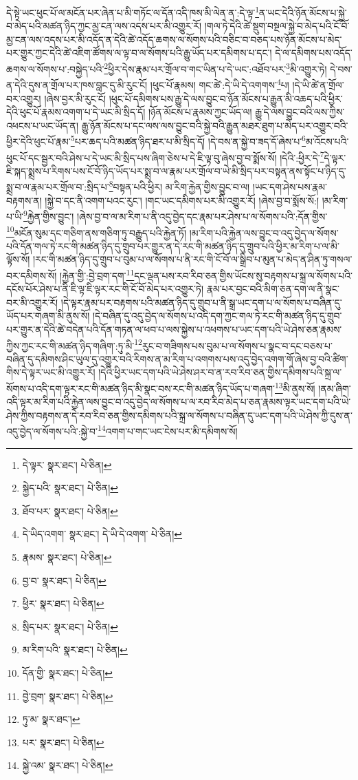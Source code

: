 དེ་སྟེ་ཡང་ཕུང་པོ་ལ་མངོན་པར་ཞེན་པ་མི་གཏོང་ལ་དོན་འདི་ཁས་མི་ལེན་ན་:དེ་ལྟ་\footnote{དེ་ལྟར་  སྣར་ཐང་།  པེ་ཅིན། }ན་ཡང་དེའི་ཉོན་མོངས་པ་སྐྱེ་བ་མེད་པའི་མཚན་ཉིད་ཀྱང་མྱ་ངན་ལས་འདས་པར་མི་འགྱུར་རོ། །གལ་ཏེ་དེའི་ཚེ་སྡུག་བསྔལ་སྐྱེ་བ་མེད་པའི་ངོ་བོ་མྱ་ངན་ལས་འདས་པར་མི་འདོད་ན་དེའི་ཚེ་འདོད་ཆགས་ལ་སོགས་པའི་བཅིང་བ་བཅད་པས་ཉོན་མོངས་པ་མེད་པར་གྱུར་ཀྱང་དེའི་ཚེ་འཇིག་ཚོགས་ལ་ལྟ་བ་ལ་སོགས་པའི་རྒྱུ་ཡོད་པར་དམིགས་པ་དང་། དེ་ལ་དམིགས་པས་འདོད་ཆགས་ལ་སོགས་པ་:བསྐྱེད་པའི་\footnote{སྐྱེད་པའི་  སྣར་ཐང་།  པེ་ཅིན། }ཕྱིར་དེས་རྣམ་པར་གྲོལ་བ་གང་ཡིན་པ་དེ་ཡང་:འཐོབ་པར་\footnote{ཐོབ་པར་  སྣར་ཐང་།  པེ་ཅིན། }མི་འགྱུར་ཏེ། དེ་བས་ན་དེའི་དུས་ན་གྲོལ་པར་ཁས་བླང་དུ་མི་རུང་ངོ། །ཕུང་པོ་རྣམས། གང་ཚེ་:དེ་ཡི་དེ་འགགས་\footnote{དེ་ཡིད་འགག་  སྣར་ཐང་། དེ་ཡི་དེ་འགག་  པེ་ཅིན། }པ། །དེ་ཡི་ཚེ་ན་གྲོལ་བར་འགྱུར། །ཞེས་བྱར་མི་རུང་ངོ། །ཕུང་པོ་དམིགས་པས་རྒྱུ་དེ་ལས་བྱུང་བ་ཉོན་མོངས་པ་རྒྱུན་མི་འཆད་པའི་ཕྱིར་དེའི་ཕུང་པོ་རྣམས་འགག་པ་དེ་ཡང་མི་སྲིད་དོ། །ཉོན་མོངས་པ་རྣམས་ཀྱང་ཡོད་ལ། རྒྱུ་དེ་ལས་བྱུང་བའི་ལས་ཀྱིས་འཕངས་པ་ཡང་ཡོད་ན། རྒྱུ་ཉོན་མོངས་པ་དང་ལས་ལས་བྱུང་བའི་སྐྱེ་བའི་རྒྱུན་མཐར་ཐུག་པ་མེད་པར་འགྱུར་བའི་ཕྱིར་དེའི་ཕུང་པོ་རྣམ་\footnote{རྣམས་  སྣར་ཐང་།  པེ་ཅིན། }པར་ཆད་པའི་མཚན་ཉིད་ཐར་པ་མི་སྲིད་དོ། །དེ་བས་ན་སྐྱེ་བ་ཟད་དོ་ཞེས་པ་\footnote{བྱ་བ་  སྣར་ཐང་།  པེ་ཅིན། }མ་འོངས་པའི་ཕུང་པོ་དང་སྦྱར་བའི་ཤེས་པ་དེ་ཡང་མི་སྲིད་པས་ཞིག་ཅེས་པ་དེ་ཇི་ལྟ་བུ་ཞེས་བྱ་བ་སྨོས་སོ། །དེའི་:ཕྱིར་དེ་\footnote{ཕྱིར་  སྣར་ཐང་།  པེ་ཅིན། }དེ་ལྟར་ཇི་སྐད་སྨྲས་པ་རིགས་པས་ངོ་བོ་ཉིད་ཡོད་པར་སྨྲ་བ་ལ་རྣམ་པར་གྲོལ་བ་ཡེ་མི་སྲིད་པར་བསྟན་ནས་སྟོང་པ་ཉིད་དུ་སྨྲ་བ་ལ་རྣམ་པར་གྲོལ་བ་:སྲིད་པ་\footnote{སྲིད་པར་  སྣར་ཐང་།  པེ་ཅིན། }བསྟན་པའི་ཕྱིར། མ་རིག་རྐྱེན་གྱིས་བྱུང་བ་ལ། །ཡང་དག་ཤེས་པས་རྣམ་བརྟགས་ན། །སྐྱེ་བ་དང་ནི་འགག་པའང་རུང་། །གང་ཡང་དམིགས་པར་མི་འགྱུར་རོ། །ཞེས་བྱ་བ་སྨོས་སོ:། །མ་རིག་པ་ཡི་\footnote{མ་རིག་པའི་  སྣར་ཐང་།  པེ་ཅིན། }རྐྱེན་གྱིས་བྱུང་། །ཞེས་བྱ་བ་ལ་མ་རིག་པ་ནི་འདུ་བྱེད་དང་རྣམ་པར་ཤེས་པ་ལ་སོགས་པའི་:དོན་གྱིས་\footnote{དོན་གྱི་  སྣར་ཐང་།  པེ་ཅིན། }མངོན་སུམ་དང་གཅིག་ནས་གཅིག་ཏུ་བརྒྱུད་པའི་རྐྱེན་ཏོ། །མ་རིག་པའི་རྐྱེན་ལས་བྱུང་བ་འདུ་བྱེད་ལ་སོགས་པའི་དོན་གལ་ཏེ་རང་གི་མཚན་ཉིད་དུ་གྲུབ་པར་གྱུར་ན་དེ་རང་གི་མཚན་ཉིད་དུ་གྲུབ་པའི་ཕྱིར་མ་རིག་པ་ལ་མི་ལྟོས་སོ། །རང་གི་མཚན་ཉིད་དུ་གྲུབ་པ་བུམ་པ་ལ་སོགས་པ་ནི་རང་གི་ངོ་བོ་ལ་སྒྲིབ་པ་མུན་པ་མེད་ན་ཤིན་ཏུ་གསལ་བར་དམིགས་སོ། །རྐྱེན་གྱི་:བྱེ་བྲག་དག་\footnote{བྱེ་བྲག་  སྣར་ཐང་།  པེ་ཅིན། }དང་ལྡན་པས་རབ་རིབ་ཅན་གྱིས་ཡོངས་སུ་བརྟགས་པ་སྐྲ་ལ་སོགས་པའི་དངོས་པོར་ཤེས་པ་ནི་ཇི་ལྟ་ཇི་ལྟར་རང་གི་ངོ་བོ་མེད་པར་འགྱུར་ཏེ། རྣམ་པར་བྱང་བའི་མིག་ཅན་དག་ལ་ནི་སྣང་བར་མི་འགྱུར་རོ། །དེ་ལྟར་རྣམ་པར་བརྟགས་པའི་མཚན་ཉིད་དུ་གྲུབ་པ་ནི་སྒྲ་ཡང་དག་པ་ལ་སོགས་པ་བཞིན་དུ་ཡོད་པར་གཞག་མི་ནུས་སོ། །དེ་བཞིན་དུ་འདུ་བྱེད་ལ་སོགས་པ་འདི་དག་ཀྱང་གལ་ཏེ་རང་གི་མཚན་ཉིད་དུ་གྲུབ་པར་གྱུར་ན་དེའི་ཚེ་བདེན་པའི་དོན་གཏན་ལ་ཕབ་པ་ལས་སྐྱེས་པ་འཕགས་པ་ཡང་དག་པའི་ཡེ་ཤེས་ཅན་རྣམས་ཀྱིས་ཀྱང་རང་གི་མཚན་ཉིད་གཞིག་:ཏུ་མི་\footnote{ཏུ་མ་  སྣར་ཐང་། }རུང་བ་གཟིགས་པས་བུམ་པ་ལ་སོགས་པ་སྣང་བ་དང་བཅས་པ་བཞིན་དུ་དམིགས་ཤིང་ཡུལ་དུ་འགྱུར་བའི་རིགས་ན་མ་རིག་པ་འགགས་པས་འདུ་བྱེད་འགག་གོ་ཞེས་བྱ་བའི་ཚིག་གིས་དེ་ལྟར་ཡང་མི་འགྱུར་རོ། །དེའི་ཕྱིར་ཡང་དག་པའི་ཡེ་ཤེས་ཤར་བ་ན་རབ་རིབ་ཅན་གྱིས་དམིགས་པའི་སྐྲ་ལ་སོགས་པ་འདི་དག་ལྟར་རང་གི་མཚན་ཉིད་མི་སྣང་བས་རང་གི་མཚན་ཉིད་ཡོད་པ་གཞག་\footnote{པར་  སྣར་ཐང་།  པེ་ཅིན། }མི་ནུས་སོ། །ནམ་ཞིག་འདི་ལྟར་མ་རིག་པའི་རྐྱེན་ལས་བྱུང་བ་འདུ་བྱེད་ལ་སོགས་པ་ལ་རབ་རིབ་མེད་པ་ཅན་རྣམས་ལྟར་ཡང་དག་པའི་ཡེ་ཤེས་ཀྱིས་བརྟགས་ན་དེ་རབ་རིབ་ཅན་གྱིས་དམིགས་པའི་སྐྲ་ལ་སོགས་པ་བཞིན་དུ་ཡང་དག་པའི་ཡེ་ཤེས་ཀྱི་དུས་ན་འདུ་བྱེད་ལ་སོགས་པའི་:སྐྱེ་བ་\footnote{སྐྱེ་འམ་  སྣར་ཐང་།  པེ་ཅིན། }འགག་པ་གང་ཡང་ངེས་པར་མི་དམིགས་སོ། 